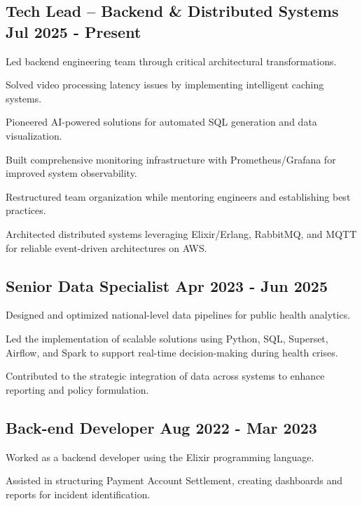 \documentclass[letter,10pt]{article}
\begin{document}
\subsection{{Tech Lead – Backend \& Distributed Systems \hfill Jul 2025 - Present}}
\begin{zitemize}
\item Led backend engineering team through critical architectural transformations. 
\item Solved video processing latency issues by implementing intelligent caching systems.
\item Pioneered AI-powered solutions for automated SQL generation and data visualization.
\item Built comprehensive monitoring infrastructure with Prometheus/Grafana for improved system observability.
\item Restructured team organization while mentoring engineers and establishing best practices.
\item Architected distributed systems leveraging Elixir/Erlang, RabbitMQ, and MQTT for reliable event-driven architectures on AWS.
\end{zitemize}

\subsection{{Senior Data Specialist \hfill Apr 2023 - Jun 2025}}
\begin{zitemize}
\item Designed and optimized national-level data pipelines for public health analytics.
\item Led the implementation of scalable solutions using Python, SQL, Superset, Airflow, and Spark to support real-time decision-making during health crises.
\item Contributed to the strategic integration of data across systems to enhance reporting and policy formulation.
\end{zitemize}

\subsection{{Back-end Developer \hfill Aug 2022 - Mar 2023}}
\begin{zitemize}
\item Worked as a backend developer using the Elixir programming language.
\item Assisted in structuring Payment Account Settlement, creating dashboards and reports for incident identification.
\end{zitemize}
\end{document}
